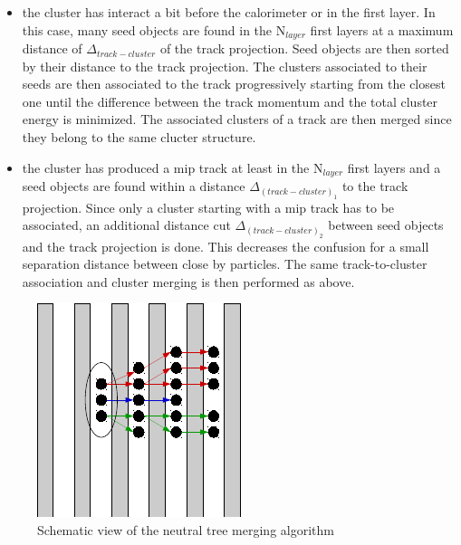 \documentclass[cits]{JINST}
\begin{document}
\begin{itemize}
  \item the cluster has interact a bit before the calorimeter or in the first layer. In this case, many seed objects are found in the N$_{layer}$ first layers at a maximum distance of $\Delta_{track-cluster}$ of the track projection. Seed objects are then sorted by their distance to the track projection. The clusters associated to their seeds are then associated to the track progressively starting from the closest one until the difference between the track momentum and the total cluster energy is minimized. The associated clusters of a track are then merged since they belong to the same clucter structure.
  \item the cluster has produced a mip track at least in the N$_{layer}$ first layers and a seed objects are found within a distance $\Delta_{(track-cluster)_1}$ to the track projection. Since only a cluster starting with a mip track has to be associated, an additional distance cut $\Delta_{(track-cluster)_2}$ between seed objects and the track projection is done. This decreases the confusion for a small separation distance between close by particles. The same track-to-cluster association and cluster merging is then performed as above.
\end{itemize}

\begin{figure}
  \vspace{-30pt}
  \begin{center}
    \includegraphics[width=\linewidth]{NeutralTreeMerging.pdf}
  \end{center}
  \vspace{-10pt}
  \caption{\label{ARBOR_NEUTRAL_TREE_MERGING} Schematic view of the neutral tree merging algorithm}
  \vspace{-40pt}
\end{figure}
\end{document}

